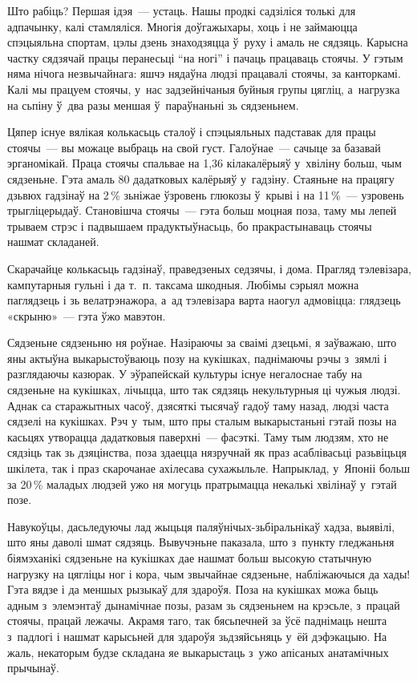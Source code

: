 Што рабіць? Першая ідэя~--- устаць. Нашы продкі садзіліся толькі для адпачынку, калі стамляліся. Многія доўгажыхары, хоць і не займаюцца спэцыяльна спортам, цэлы дзень знаходзяцца ў~руху і амаль не сядзяць. Карысна частку сядзячай працы перанесьці ``на ногі'' і пачаць працаваць стоячы. У гэтым няма нічога незвычайнага: яшчэ нядаўна людзі працавалі стоячы, за канторкамі. Калі мы працуем стоячы, у~нас задзейнічаныя буйныя групы цягліц, а~нагрузка на сьпіну ў~два разы меншая ў~параўнаньні зь сядзеньнем.

Цяпер існуе вялікая колькасьць сталоў і спэцыяльных падставак для працы стоячы~--- вы можаце выбраць на свой густ. Галоўнае~--- сачыце за базавай эрганомікай. Праца стоячы спальвае на 1,36 кілакалёрыяў у~хвіліну больш, чым сядзеньне. Гэта амаль 80 дадатковых калёрыяў у~гадзіну. Стаяньне на працягу дзьвюх гадзінаў на 2\,\% зьніжае ўзровень глюкозы ў~крыві і на 11\,\%~--- узровень трыгліцерыдаў. Становішча стоячы~--- гэта больш моцная поза, таму мы лепей трываем стрэс і падвышаем прадуктыўнасьць, бо пракрастынаваць стоячы нашмат складаней.

Скарачайце колькасьць гадзінаў, праведзеных седзячы, і дома. Прагляд тэлевізара, кампутарныя гульні і да т.~п. таксама шкодныя. Любімы сэрыял можна паглядзець і зь велатрэнажора, а~ад тэлевізара варта наогул адмовіцца: глядзець «скрыню»~--- гэта ўжо мавэтон.

Сядзеньне сядзеньню ня роўнае. Назіраючы за сваімі дзецьмі, я заўважаю, што яны актыўна выкарыстоўваюць позу на кукішках, паднімаючы рэчы з~зямлі і разглядаючы казюрак. У эўрапейскай культуры існуе негалоснае табу на сядзеньне на кукішках, лічыцца, што так сядзяць некультурныя ці чужыя людзі. Аднак са старажытных часоў, дзясяткі тысячаў гадоў таму назад, людзі часта сядзелі на кукішках. Рэч у~тым, што пры сталым выкарыстаньні гэтай позы на касьцях утворацца дадатковыя паверхні~--- фасэткі. Таму тым людзям, хто не сядзіць так зь дзяцінства, поза здаецца нязручнай як праз асаблівасьці разьвіцьця шкілета, так і праз скарочанае ахілесава сухажыльле. Напрыклад, у~Японіі больш за 20\,\% маладых людзей ужо ня могуць пратрымацца некалькі хвілінаў у~гэтай позе.

Навукоўцы, дасьледуючы лад жыцьця паляўнічых-зьбіральнікаў хадза, выявілі, што яны даволі шмат сядзяць. Вывучэньне паказала, што з~пункту гледжаньня біямэханікі сядзеньне на кукішках дае нашмат больш высокую статычную нагрузку на цягліцы ног і кора, чым звычайнае сядзеньне, набліжаючыся да хады! Гэта вядзе і да меншых рызыкаў для здароўя. Поза на кукішках можа быць адным з~элемэнтаў дынамічнае позы, разам зь сядзеньнем на крэсьле, з~працай стоячы, працай лежачы. Акрамя таго, так бясьпечней за ўсё паднімаць нешта з~падлогі і нашмат карысьней для здароўя зьдзяйсьняць у~ёй дэфэкацыю. На жаль, некаторым будзе складана яе выкарыстаць з~ужо апісаных анатамічных прычынаў.

